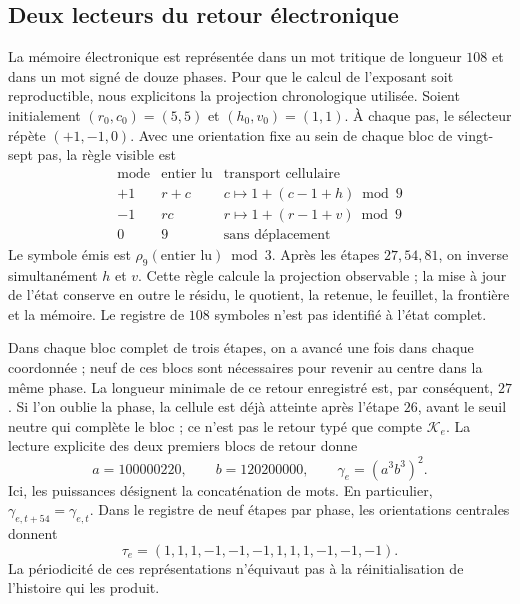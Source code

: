 \subsection{Deux lecteurs du retour électronique}

La mémoire électronique est représentée dans un mot tritique de longueur \(108\) et dans un mot signé de douze phases. Pour que le calcul de l'exposant soit reproductible, nous explicitons la projection chronologique utilisée. Soient initialement \((r_0,c_0)=(5,5)\) et \((h_0,v_0)=(1,1)\). À chaque pas, le sélecteur répète \((+1,-1,0)\). Avec une orientation fixe au sein de chaque bloc de vingt-sept pas, la règle visible est
\[
 \begin{array}{c|c|c}
 \text{mode}&\text{entier lu}&\text{transport cellulaire}\\\hline
 +1&r+c&c\mapsto1+(c-1+h)\bmod9\\
 -1&rc&r\mapsto1+(r-1+v)\bmod9\\
 0&9&\text{sans déplacement}
 \end{array}
\]
Le symbole émis est \(\rho_9(\text{entier lu})\bmod3\).
Après les étapes \(27,54,81\), on inverse simultanément
\(h\) et \(v\). Cette règle calcule la projection observable ; la
mise à jour de l'état conserve en outre le résidu, le quotient,
la retenue, le feuillet, la frontière et la mémoire. Le registre de
\(108\) symboles n'est pas identifié à l'état complet.

Dans chaque bloc complet de trois étapes, on a avancé une fois dans chaque
coordonnée ; neuf de ces blocs sont nécessaires pour revenir au centre dans
la même phase. La longueur minimale de ce retour enregistré est, par
conséquent, \(27\). Si l'on oublie la phase, la cellule est déjà atteinte après
l'étape \(26\), avant le seuil neutre qui complète le bloc ; ce n'est pas
le retour typé que compte \(\mathcal K_e\). La lecture explicite
des deux premiers blocs de retour donne
\begin{equation}
 a=100000220,\qquad b=120200000,\qquad
 \gamma_e=(a^3b^3)^2.
 \label{eq:el-palabra}
\end{equation}
Ici, les puissances désignent la concaténation de mots. En particulier,
\(\gamma_{e,t+54}=\gamma_{e,t}\). Dans le registre de neuf étapes par
phase, les orientations centrales donnent
\begin{equation}
 \tau_e=(1,1,1,-1,-1,-1,1,1,1,-1,-1,-1).
 \label{eq:el-tau}
\end{equation}
La périodicité de ces représentations n'équivaut pas à la réinitialisation de l'histoire qui les produit.


